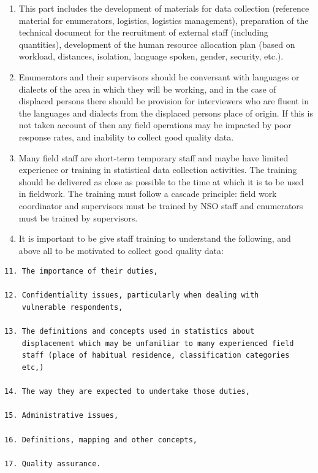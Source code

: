 \documentclass[
]{article}
\begin{document}
\begin{enumerate}
\def\labelenumi{\arabic{enumi}.}
\setcounter{enumi}{305}
\item
  This part includes the development of materials for data collection
  (reference material for enumerators, logistics, logistics
  management), preparation of the technical document for the
  recruitment of external staff (including quantities), development of
  the human resource allocation plan (based on workload, distances,
  isolation, language spoken, gender, security, etc.).
\item
  Enumerators and their supervisors should be conversant with
  languages or dialects of the area in which they will be working, and
  in the case of displaced persons there should be provision for
  interviewers who are fluent in the languages and dialects from the
  displaced persons place of origin. If this is not taken account of
  then any field operations may be impacted by poor response rates,
  and inability to collect good quality data.
\item
  Many field staff are short-term temporary staff and maybe have
  limited experience or training in statistical data collection
  activities. The training should be delivered as close as possible to
  the time at which it is to be used in fieldwork. The training must
  follow a cascade principle: field work coordinator and supervisors
  must be trained by NSO staff and enumerators must be trained by
  supervisors.
\item
  It is important to be give staff training to understand the
  following, and above all to be motivated to collect good quality
  data:
\end{enumerate}

\begin{verbatim}
11. The importance of their duties,

12. Confidentiality issues, particularly when dealing with
    vulnerable respondents,

13. The definitions and concepts used in statistics about
    displacement which may be unfamiliar to many experienced field
    staff (place of habitual residence, classification categories
    etc,)

14. The way they are expected to undertake those duties,

15. Administrative issues,

16. Definitions, mapping and other concepts,

17. Quality assurance.
\end{verbatim}
\end{document}
